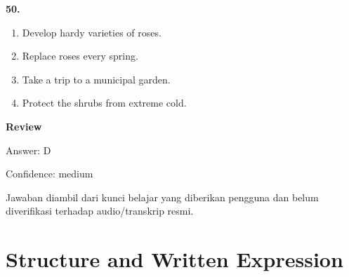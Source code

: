 \documentclass[12pt]{article}
\begin{document}
\endgroup
\par
\vspace{0.25\baselineskip}
\noindent\textbf{50.}
\begin{enumerate}[label=(\Alph*),leftmargin=*,itemsep=0.2em]
\item Develop hardy varieties of roses.
\item Replace roses every spring.
\item Take a trip to a municipal garden.
\item Protect the shrubs from extreme cold.
\end{enumerate}
\par
\begingroup
\setlength{\parskip}{0pt}
\setlength{\parindent}{0pt}
\textbf{Review}\par
Answer: D\par
Confidence: medium\par
Jawaban diambil dari kunci belajar yang diberikan pengguna dan belum diverifikasi terhadap audio/transkrip resmi.\par
\endgroup
\par
\vspace{0.25\baselineskip}
\section*{Structure and Written Expression}
\end{document}
